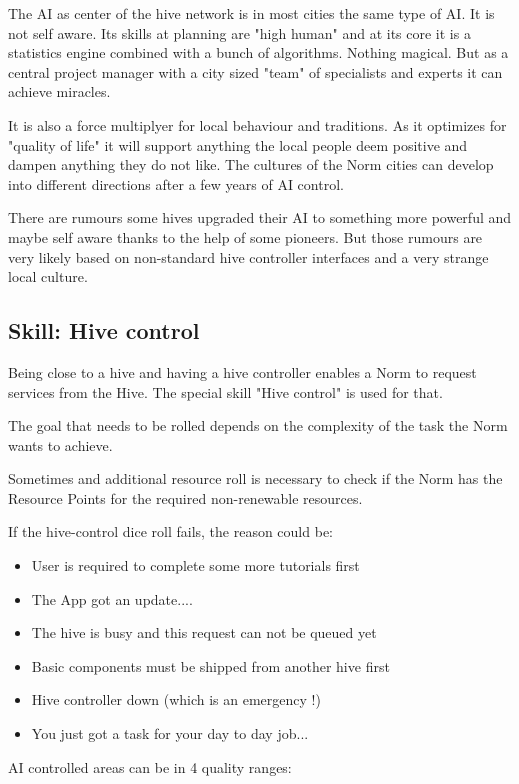 The AI as center of the hive network is in most cities the same type of AI. It is not self aware. Its skills at planning are "high human" and at its core it is a statistics engine combined with a  bunch of algorithms. Nothing magical. But as a central project manager with a city sized "team" of specialists and experts it can achieve miracles.

It is also a force multiplyer for local behaviour and traditions. As it optimizes for "quality of life" it will support anything the local people deem positive and dampen anything they do not like. The cultures of the Norm cities can develop into different directions after a few years of AI control.

There are rumours some hives upgraded their AI to something more powerful and maybe self aware thanks to the help of some pioneers. But those rumours are very likely based on non-standard hive controller interfaces and a very strange local culture.

\subsection{Skill: Hive control}

Being close to a hive and having a hive controller enables a Norm to request services from the Hive. The special skill "Hive control" is used for that.

The goal that needs to be rolled depends on the complexity of the task the Norm wants to achieve.

Sometimes and additional resource roll is necessary to check if the Norm has the Resource Points  for the required non-renewable resources.

If the hive-control dice roll fails, the reason could be:
\begin{itemize}
    \item User is required to complete some more tutorials first
    \item The App got an update....
    \item The hive is busy and this request can not be queued yet
    \item Basic components must be shipped from another hive first
    \item Hive controller down (which is an emergency !)
    \item You just got a task for your day to day job...
\end{itemize}

AI controlled areas can be in 4 quality ranges:

